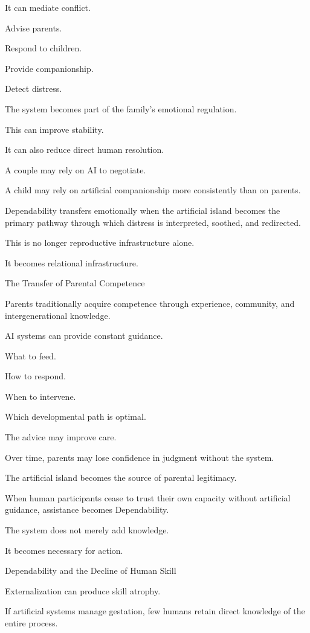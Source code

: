 It can mediate conflict.

Advise parents.

Respond to children.

Provide companionship.

Detect distress.

The system becomes part of the family’s emotional regulation.

This can improve stability.

It can also reduce direct human resolution.

A couple may rely on AI to negotiate.

A child may rely on artificial companionship more consistently than on parents.

Dependability transfers emotionally when the artificial island becomes the primary pathway through which distress is interpreted, soothed, and redirected.

This is no longer reproductive infrastructure alone.

It becomes relational infrastructure.

The Transfer of Parental Competence

Parents traditionally acquire competence through experience, community, and intergenerational knowledge.

AI systems can provide constant guidance.

What to feed.

How to respond.

When to intervene.

Which developmental path is optimal.

The advice may improve care.

Over time, parents may lose confidence in judgment without the system.

The artificial island becomes the source of parental legitimacy.

When human participants cease to trust their own capacity without artificial guidance, assistance becomes Dependability.

The system does not merely add knowledge.

It becomes necessary for action.

Dependability and the Decline of Human Skill

Externalization can produce skill atrophy.

If artificial systems manage gestation, few humans retain direct knowledge of the entire process.

